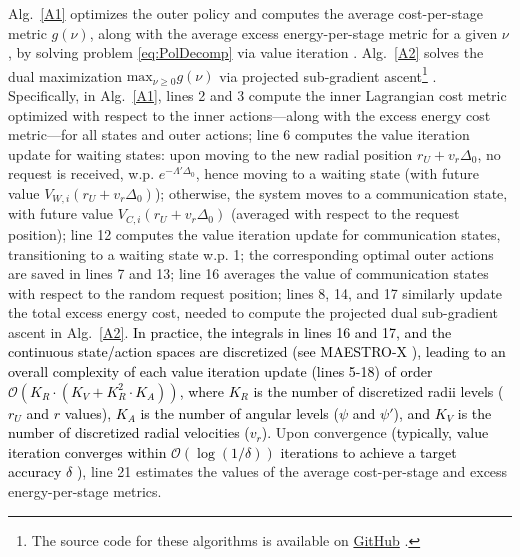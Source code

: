\documentclass[10pt, twocolumn]{IEEEtran}
\theoremstyle{plain}
\theoremstyle{definition}
\theoremstyle{remark}
\newcommand\hlt[1]{\textcolor{black}{#1}}
\begin{document}
Alg.~\ref{A1} optimizes the outer policy and computes the average cost-per-stage metric $g(\nu)$, along with the average excess energy-per-stage metric for a given $\nu$, by solving problem \eqref{eq:PolDecomp} via value iteration \cite{Bertsekas}. Alg.~\ref{A2} solves the dual maximization $\mathrm{max}_{\nu{\geq}0}g(\nu)$ via projected sub-gradient ascent\footnote{The source code for these algorithms is available on \href{https://github.com/bharathkeshavamurthy/MAESTRO-X.git}{GitHub} \cite{MAESTRO-X}.} \cite{SubgradientMethods}. Specifically, in Alg.~\ref{A1}, lines 2 and 3 compute the inner Lagrangian cost metric optimized with respect to the inner actions---along with the excess energy cost metric---for all states and outer actions; line 6 computes the value iteration update for waiting states:
upon moving to the new radial position $r_{U}{+}v_{r}\Delta_{0}$, 
no request is received, w.p. $e^{-\Lambda'\Delta_{0}}$, hence moving to a waiting state (with future value $V_{W,i}(r_{U}{+}v_{r}\Delta_{0})$); otherwise, the system moves to a communication state, with future value $V_{C,i}(r_{U}{+}v_{r}\Delta_{0})$ (averaged with respect to the request position); line 12 computes the value iteration update for communication states, transitioning to a waiting state w.p. 1; the corresponding optimal outer actions are saved in lines 7 and 13; line 16 averages the value of communication states with respect to the random request position; lines 8, 14, and 17 similarly update the total excess energy cost, needed to compute the projected dual sub-gradient ascent in Alg.~\ref{A2}.
\label{discretizeVI}\hlt{In practice, the integrals in lines 16 and 17, and the continuous state/action spaces are discretized (see MAESTRO-X \cite{MAESTRO-X}), leading to an overall complexity of each value iteration update (lines 5-18) of order $\mathcal O(K_R\cdot(K_V+K_R^2\cdot K_A))$, where $K_R$ is the number of discretized radii levels ($r_U$ and $r$ values), $K_A$ is the number of angular levels ($\psi$ and $\psi'$), and $K_V$ is the number of discretized radial velocities ($v_r$).} Upon convergence \hlt{(typically, value iteration converges within $\mathcal O(\log(1/\delta))$ iterations to achieve a target accuracy $\delta$ \cite[Sec. V]{Bertsekas})}, line 21 estimates the values of the average cost-per-stage and excess energy-per-stage metrics.
\end{document}
